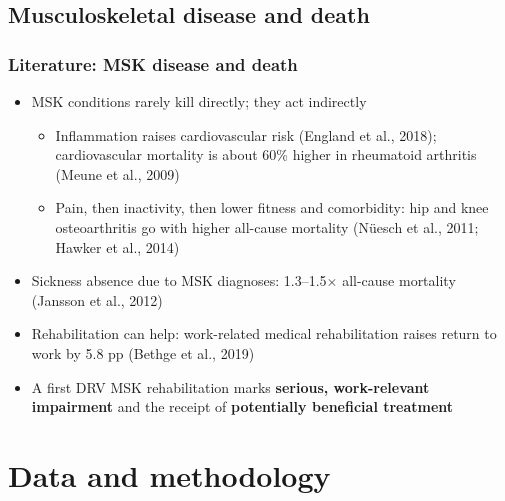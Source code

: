 \documentclass[t,20pt]{beamer}
\newcommand{\hl}[1]{\textcolor{BiBViolett}{\textbf{#1}}}           %
\newcommand{\ct}[1]{{\color{BiBBlau80}(#1)}}                        %
\begin{document}
\subsection{Musculoskeletal disease and death}
\begin{bibframe}
  \frametitle{Literature: MSK disease and death}
  \begin{itemize}
    \item MSK conditions rarely kill directly; they act indirectly
    \begin{itemize}
      \item Inflammation raises cardiovascular risk \ct{England et al., 2018}; cardiovascular mortality is about 60\% higher in rheumatoid arthritis \ct{Meune et al., 2009}
      \item Pain, then inactivity, then lower fitness and comorbidity: hip and knee osteoarthritis go with higher all-cause mortality \ct{Nüesch et al., 2011; Hawker et al., 2014}
    \end{itemize}
    \item Sickness absence due to MSK diagnoses: 1.3--1.5$\times$ all-cause mortality \ct{Jansson et al., 2012}
    \item Rehabilitation can help: work-related medical rehabilitation raises return to work by 5.8 pp \ct{Bethge et al., 2019}
    \item[$\rightarrow$] A first DRV MSK rehabilitation marks \hl{serious, work-relevant impairment} and the receipt of \hl{potentially beneficial treatment}
  \end{itemize}
\end{bibframe}

\section{Data and methodology}
\end{document}
